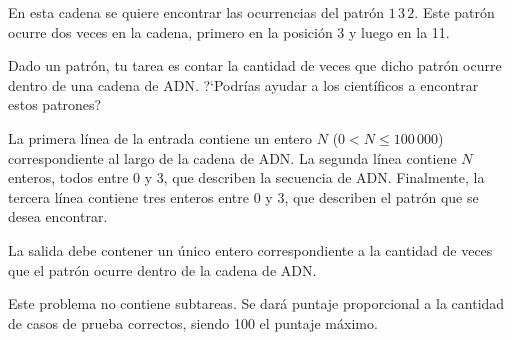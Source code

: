 \documentclass{oci}
\begin{document}
\begin{problemDescription}
  En esta cadena se quiere encontrar las ocurrencias del patrón $1\,3\,2$.
  Este patrón ocurre dos veces en la cadena, primero en la posición 3 y luego
  en la 11.
  
  Dado un patrón, tu tarea es contar la cantidad de veces que dicho patrón ocurre
  dentro de una cadena de ADN.
  ?`Podrías ayudar a los científicos a encontrar estos patrones?
\end{problemDescription}

\begin{inputDescription}
  La primera línea de la entrada contiene un entero $N$ ($0 < N \leq 100\,000$)
  correspondiente al largo de la cadena de ADN.
  La segunda línea contiene $N$ enteros, todos entre 0 y 3, que describen la
  secuencia de ADN.
  Finalmente, la tercera línea contiene tres enteros entre 0 y 3, que describen
  el patrón que se desea encontrar.
\end{inputDescription}

\begin{outputDescription}
  La salida debe contener un único entero correspondiente a la cantidad de veces
  que el patrón ocurre dentro de la cadena de ADN.
\end{outputDescription}

\begin{scoreDescription}
  Este problema no contiene subtareas.
  Se dará puntaje proporcional a la cantidad de casos de prueba correctos, siendo
  100 el puntaje máximo.
\end{scoreDescription}

\begin{sampleDescription}
\end{sampleDescription}
\end{document}
